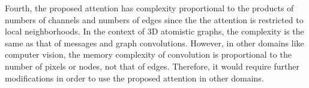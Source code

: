 
Fourth, the proposed attention has complexity proportional to the products of numbers of channels and numbers of edges since the the attention is restricted to local neighborhoods. 
In the context of 3D atomistic graphs, the complexity is the same as that of messages and graph convolutions.
However, in other domains like computer vision, the memory complexity of convolution is proportional to the number of pixels or nodes, not that of edges. 
Therefore, it would require further modifications in order to use the proposed attention in other domains.
